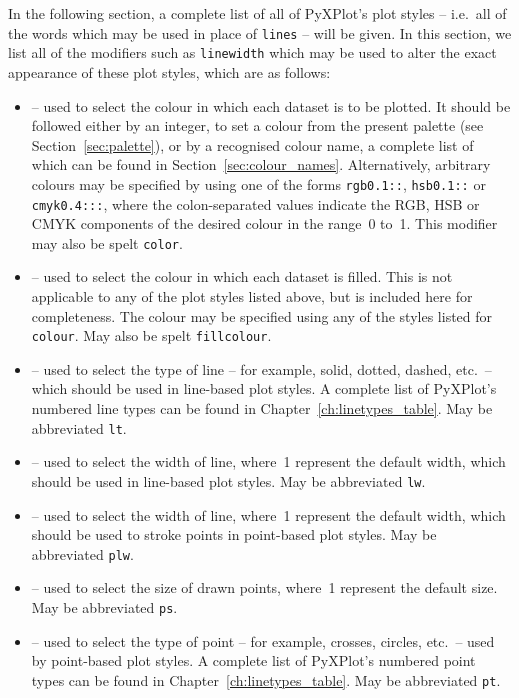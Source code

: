 In the following section, a complete list of all of PyXPlot's plot styles --
i.e.\ all of the words which may be used in place of {\tt lines} -- will be
given. In this section, we list all of the modifiers such as {\tt line\-width}
which may be used to alter the exact appearance of these plot styles, which are
as follows:
\begin{itemize}
\item {} -- used to select the colour in which each dataset is to be plotted. It should be followed either by an integer, to set a colour from the present palette (see Section~\ref{sec:palette}), or by a recognised colour name, a complete list of which can be found in Section~\ref{sec:colour_names}. Alternatively, arbitrary colours may be specified by using one of the forms {\tt rgb0.1::}, {\tt hsb0.1::} or {\tt cmyk0.4:::}, where the colon-separated values indicate the RGB, HSB or CMYK components of the desired colour in the range~0 to~1. This modifier may also be spelt {\tt color}.
\item {} -- used to select the colour in which each dataset is filled. This is not applicable to any of the plot styles listed above, but is included here for completeness. The colour may be specified using any of the styles listed for {\tt colour}. May also be spelt {\tt fillcolour}.
\item {} -- used to select the type of line -- for example, solid, dotted, dashed, etc.\ -- which should be used in line-based plot styles. A complete list of PyXPlot's numbered line types can be found in Chapter~\ref{ch:linetypes_table}. May be abbreviated {\tt lt}.
\item {} -- used to select the width of line, where~1 represent the default width, which should be used in line-based plot styles. May be abbreviated {\tt lw}.
\item {} -- used to select the width of line, where~1 represent the default width, which should be used to stroke points in point-based plot styles. May be abbreviated {\tt plw}.
\item {} -- used to select the size of drawn points, where~1 represent the default size. May be abbreviated {\tt ps}.
\item {} -- used to select the type of point -- for example, crosses, circles, etc.\ -- used by point-based plot styles. A complete list of PyXPlot's numbered point types can be found in Chapter~\ref{ch:linetypes_table}. May be abbreviated {\tt pt}.
\end{itemize}

